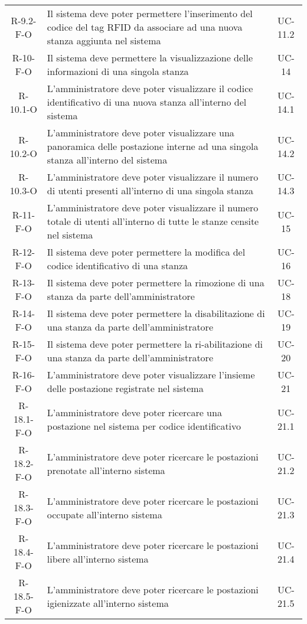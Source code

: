 \begin{longtable}{ c C{9.5cm} c }
    R-9.2-F-O & Il sistema deve poter permettere l'inserimento del codice del tag RFID da associare ad una nuova stanza aggiunta nel sistema& UC- 11.2\\
    R-10-F-O &  Il sistema deve permettere la visualizzazione delle informazioni di una singola stanza& UC- 14\\
    R-10.1-O &  L'amministratore deve poter visualizzare il codice identificativo di una nuova stanza all'interno del sistema& UC- 14.1\\
    R-10.2-O &  L'amministratore deve poter visualizzare una panoramica delle postazione interne ad una singola stanza all'interno del sistema& UC- 14.2\\
    R-10.3-O &  L'amministratore deve poter visualizzare il numero di utenti presenti all'interno di una singola stanza& UC- 14.3\\
    R-11-F-O &  L'amministratore deve poter visualizzare il numero totale di utenti all'interno di tutte le stanze censite nel sistema& UC- 15\\
    R-12-F-O &  Il sistema deve poter permettere la modifica del codice identificativo di una stanza& UC- 16\\
    R-13-F-O &  Il sistema deve poter permettere la rimozione di una stanza da parte dell'amministratore& UC- 18\\
    R-14-F-O &  Il sistema deve poter permettere la disabilitazione di una stanza da parte dell'amministratore& UC- 19\\
    R-15-F-O &  Il sistema deve poter permettere la ri-abilitazione di una stanza da parte dell'amministratore& UC- 20\\
    R-16-F-O & L'amministratore deve poter visualizzare l'insieme delle postazione registrate nel sistema& UC- 21\\
    R-18.1-F-O & L'amministratore deve poter ricercare una postazione nel sistema per codice identificativo& UC- 21.1\\
    R-18.2-F-O & L'amministratore deve poter ricercare le postazioni prenotate all'interno sistema& UC- 21.2\\
    R-18.3-F-O & L'amministratore deve poter ricercare le postazioni occupate all'interno sistema& UC- 21.3\\
    R-18.4-F-O & L'amministratore deve poter ricercare le postazioni libere all'interno sistema& UC- 21.4\\
    R-18.5-F-O & L'amministratore deve poter ricercare le postazioni igienizzate all'interno sistema& UC- 21.5\\

\end{longtable}
